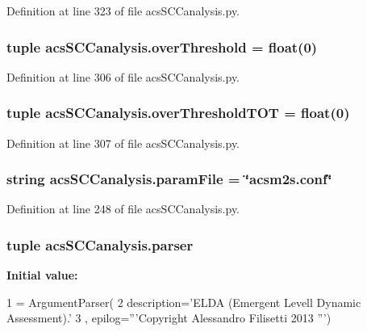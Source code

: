 Definition at line 323 of file acs\-S\-C\-Canalysis.\-py.

\hypertarget{a00097_a12e61f8d7aadb52256a7728af342bae3}{
\subsubsection[{over\-Threshold}]{\setlength{\rightskip}{0pt plus 5cm}tuple acs\-S\-C\-Canalysis.\-over\-Threshold = float(0)}}\label{a00097_a12e61f8d7aadb52256a7728af342bae3}


Definition at line 306 of file acs\-S\-C\-Canalysis.\-py.

\hypertarget{a00097_a93de20dd9ebf791127ac5aefc0a2df8d}{
\subsubsection[{over\-Threshold\-T\-O\-T}]{\setlength{\rightskip}{0pt plus 5cm}tuple acs\-S\-C\-Canalysis.\-over\-Threshold\-T\-O\-T = float(0)}}\label{a00097_a93de20dd9ebf791127ac5aefc0a2df8d}


Definition at line 307 of file acs\-S\-C\-Canalysis.\-py.

\hypertarget{a00097_a7160f8e48b4aafebbd75e9037fc9fef7}{
\subsubsection[{param\-File}]{\setlength{\rightskip}{0pt plus 5cm}string acs\-S\-C\-Canalysis.\-param\-File = \char`\"{}acsm2s.\-conf\char`\"{}}}\label{a00097_a7160f8e48b4aafebbd75e9037fc9fef7}


Definition at line 248 of file acs\-S\-C\-Canalysis.\-py.

\hypertarget{a00097_ae47150d99d4a8e7173bb73a271c4a740}{
\subsubsection[{parser}]{\setlength{\rightskip}{0pt plus 5cm}tuple acs\-S\-C\-Canalysis.\-parser}}\label{a00097_ae47150d99d4a8e7173bb73a271c4a740}
{\bfseries Initial value\-:}
\begin{DoxyCode}
1 = ArgumentParser(
2                                 description=\textcolor{stringliteral}{'ELDA (Emergent Levell Dynamic       Assessment).'}
3                                 , epilog=\textcolor{stringliteral}{'''Copyright Alessandro Filisetti 2013 '''})
\end{DoxyCode}


